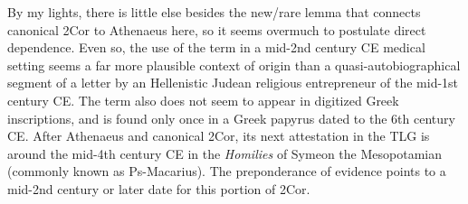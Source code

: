 By my lights, there is little else besides the new/rare lemma that %
connects canonical 2Cor to Athenaeus here, so it seems overmuch to postulate direct dependence. %
Even so, the use of the term in a mid-2nd century CE medical setting seems a %
far more plausible context of origin than %
a quasi-autobiographical segment of a letter by an Hellenistic Judean religious entrepreneur of the mid-1st century CE. %
The term also does not seem to appear in digitized Greek inscriptions, %
and is found only once in a Greek papyrus dated to the 6th century CE. %
After Athenaeus and canonical 2Cor, its next attestation in the TLG is around the mid-4th century CE %
in the \textit{Homilies} of Symeon the Mesopotamian (commonly known as Ps-Macarius). %
The preponderance of evidence points to a mid-2nd century or later date for this portion of 2Cor. %